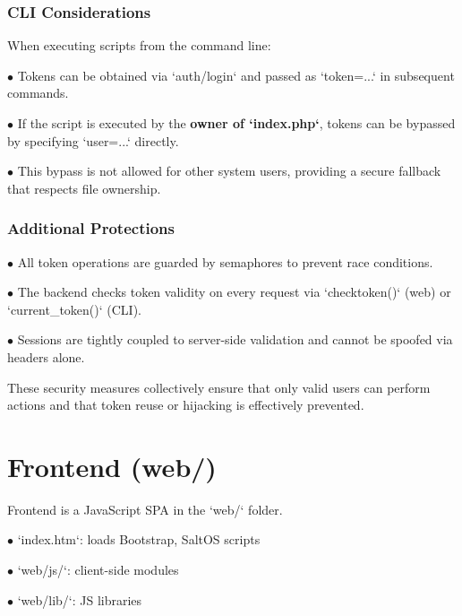 \documentclass[a4paper]{article}
\begin{document}
\hypertarget{toc29}{}
\subsubsection{CLI Considerations}

When executing scripts from the command line:

\begin{compactitem}
\item[\color{myblue}$\bullet$] Tokens can be obtained via `auth/login` and passed as `token=...` in subsequent commands.
\item[\color{myblue}$\bullet$] If the script is executed by the \textbf{owner of `index.php`}, tokens can be bypassed by specifying `user=...` directly.
\item[\color{myblue}$\bullet$] This bypass is not allowed for other system users, providing a secure fallback that respects file ownership.
\end{compactitem}

\hypertarget{toc30}{}
\subsubsection{Additional Protections}

\begin{compactitem}
\item[\color{myblue}$\bullet$] All token operations are guarded by semaphores to prevent race conditions.
\item[\color{myblue}$\bullet$] The backend checks token validity on every request via `checktoken()` (web) or `current\_token()` (CLI).
\item[\color{myblue}$\bullet$] Sessions are tightly coupled to server-side validation and cannot be spoofed via headers alone.
\end{compactitem}

These security measures collectively ensure that only valid users can perform actions and that token reuse or hijacking is effectively prevented.


\hypertarget{toc31}{}
\section{Frontend (web/)}

Frontend is a JavaScript SPA in the `web/` folder.

\begin{compactitem}
\item[\color{myblue}$\bullet$] `index.htm`: loads Bootstrap, SaltOS scripts
\item[\color{myblue}$\bullet$] `web/js/`: client-side modules
\item[\color{myblue}$\bullet$] `web/lib/`: JS libraries
\end{compactitem}
\end{document}
